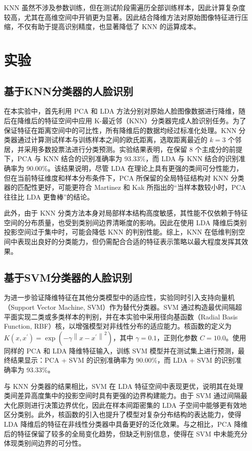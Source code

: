 \documentclass[a4paper, utf8]{ctexart}
\begin{document}
	KNN 虽然不涉及参数训练，但在测试阶段需遍历全部训练样本，因此计算复杂度较高，尤其在高维空间中开销更为显著。因此结合降维方法对原始图像特征进行压缩，不仅有助于提高识别精度，也显著降低了 KNN 的运算成本\cite{ml1, ml2, ml3}。
	
	\section{实验}
	
	\subsection{基于KNN分类器的人脸识别}
	
	在本实验中，首先利用 PCA 和 LDA 方法分别对原始人脸图像数据进行降维，随后在降维后的特征空间中应用 K-最近邻（KNN）分类器完成人脸识别任务。为了保证特征在距离空间中的可比性，所有降维后的数据均经过标准化处理。KNN 分类器通过计算测试样本与训练样本之间的欧氏距离，选取距离最近的 $k=3$ 个邻居，并采用多数投票法进行分类预测。实验结果表明，在保留 8 个主成分的前提下，PCA 与 KNN 结合的识别准确率为 93.33\%，而 LDA 与 KNN 结合的识别准确率为 90.00\%。该结果说明，尽管 LDA 在理论上具有更强的类间可分性能力，但在当前特征维度和样本分布条件下，PCA 所保留的全局特征结构对 KNN 分类器的匹配性更好，可能更符合 Martinez 和 Kak 所指出的“当样本数较小时，PCA 往往比 LDA 更鲁棒”的结论\cite{pcavslda}。
	
	此外，由于 KNN 分类方法本身对局部样本结构高度敏感，其性能不仅依赖于特征空间的分布质量，也受到类别间边界清晰度的影响。因此在使用 LDA 降维后类别投影空间过于集中时，可能会降低 KNN 的判别性能。综上，KNN 在低维判别空间中表现出良好的分类能力，但仍需配合合适的特征表示策略以最大程度发挥其效果。
	
	\subsection{基于SVM分类器的人脸识别}
	
	为进一步验证降维特征在其他分类模型中的适应性，实验同时引入支持向量机（Support Vector Machine, SVM）作为替代分类器。SVM 通过构造最优间隔超平面实现二类或多类样本的判别，并在本实验中采用径向基函数（Radial Basis Function, RBF）核，以增强模型对非线性分布的适应能力。核函数的定义为 $K(x, x^{\prime})=\exp(-\gamma\left\|x-x^{\prime}\right\|^2)$，其中 $\gamma=0.1$，正则化参数 $C=10.0$。使用同样的 PCA 和 LDA 降维特征输入，训练 SVM 模型并在测试集上进行预测，最终结果显示：PCA + SVM 的识别准确率为 90.00\%，而 LDA + SVM 的识别准确率为 93.33\%。
	
	与 KNN 分类器的结果相比，SVM 在 LDA 特征空间中表现更优，说明其在处理类间差异高度集中的投影空间时具有更强的边界构建能力。由于 SVM 通过间隔最大化原则进行决策边界优化，因此在样本间距密集的 LDA 子空间中能够更有效地区分类别。此外，核函数的引入也提升了模型对复杂分布结构的表达能力，使得 LDA 降维后的特征在非线性分类器中具备更好的泛化效果。与之相比，PCA 降维后的特征保留了较多的全局变化趋势，但缺乏判别信息，使得在 SVM 中未能充分体现类别间边界的可分性。
	
\end{document}
